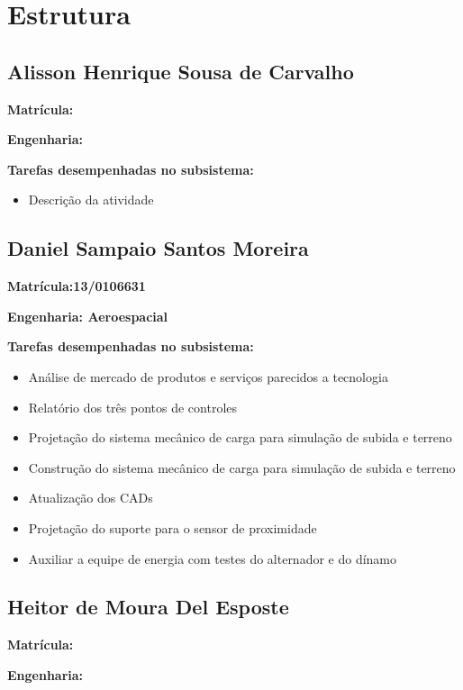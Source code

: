 \section{Estrutura}


\subsection{Alisson Henrique Sousa de Carvalho}

\textbf{Matrícula:}

\textbf{Engenharia:}

\textbf{Tarefas desempenhadas no subsistema:}

\begin{itemize}
\item Descrição da atividade
\end{itemize}


\subsection{Daniel Sampaio Santos Moreira}

\textbf{Matrícula:13/0106631}

\textbf{Engenharia: Aeroespacial}

\textbf{Tarefas desempenhadas no subsistema:}

\begin{itemize}
\item Análise de mercado de produtos e serviços parecidos a tecnologia
\item Relatório dos três pontos de controles
\item Projetação do sistema mecânico de carga para simulação de subida e terreno
\item Construção do sistema mecânico de carga para simulação de subida e terreno
\item Atualização dos CADs
\item Projetação do suporte para o sensor de proximidade
\item Auxiliar a equipe de energia com testes do alternador e do dínamo
\end{itemize}


\subsection{Heitor de Moura Del Esposte}

\textbf{Matrícula:}

\textbf{Engenharia:}


